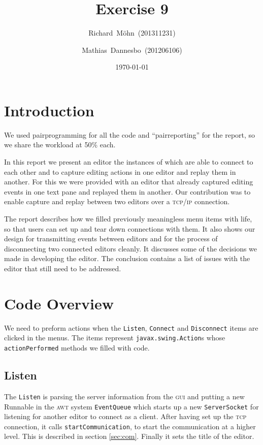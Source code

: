 \documentclass[a4paper,draft,12pt,oneside,article,table]{memoir}
\newcommand{\supertitle}[1]{\gdef\suP{#1}}
\newcommand{\subtitle}[1]{\gdef\suB{#1}}
\newcommand{\stunum}[1]{\gdef\stuN{#1}}
\newcommand{\mil}[1]{\texttt{#1}}
\begin{document}
\supertitle{Distributed Systems}
\title{Exercise 9}
\author{Richard~Möhn~\small{(201311231)} \and Mathias~Dannesbo~\small{(201206106)}}
\date{\today}
\maketitle

\chapter{Introduction}
We used pairprogramming for all the code and ``pairreporting'' for the report, so we share the workload at 50\% each.

In this report we present an editor the instances of which are able to
connect to each other and to capture editing actions in one editor and
replay them in another. For this we were provided with an editor that
already captured editing events in one text pane and replayed them in
another. Our contribution was to enable capture and replay between
two editors over a \textsc{tcp/ip} connection.

The report describes how we filled previously meaningless menu items
with life, so that users can set up and tear down connections with them.
It also shows our design for transmitting events between editors and for
the process of disconnecting two connected editors cleanly. It discusses
some of the decisions we made in developing the editor. The conclusion
contains a list of issues with the editor that still need to be
addressed.

\chapter{Code Overview}
We need to preform actions when the \mil{Listen}, \mil{Connect} and \mil{Disconnect} items are clicked in the menus. The items represent \mil{javax.swing.Action}s whose \mil{actionPerformed} methods we filled with code.

\section{Listen}

The \mil{Listen} is parsing the server information from the \textsc{gui} and putting a new Runnable in the \textsc{awt} system \mil{EventQueue} which starts up a new \mil{ServerSocket} for listening for another editor to connect as a client. After having set up the \textsc{tcp} connection, it calls \mil{startCommunication}, to start the communication at a higher level. This is described in section \ref{sec:com}. Finally it sets the title of the editor.
\end{document}

